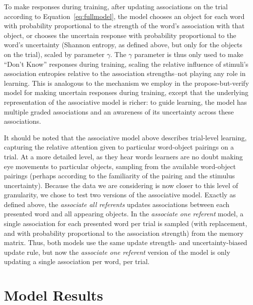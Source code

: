 \documentclass[man,floatsintext]{apa6}
\begin{document}
To make responses during training, after updating associations on the trial according to Equation~\ref{eq:fullmodel}, the model chooses an object for each word with probability proportional to the strength of the word's association with that object, or chooses the uncertain response with probability proportional to the word's uncertainty (Shannon entropy, as defined above, but only for the objects on the trial), scaled by parameter $\gamma$. The $\gamma$ parameter is thus only used to make ``Don't Know'' responses during training, scaling the relative influence of stimuli's association entropies relative to the association strengths--not playing any role in learning. This is analogous to the mechanism we employ in the propose-but-verify model for making uncertain responses during training, except that the underlying representation of the associative model is richer: to guide learning, the model has multiple graded associations and an awareness of its uncertainty across these associations.

It should be noted that the associative model above describes trial-level learning, capturing the relative attention given to particular word-object pairings on a trial. At a more detailed level, as they hear words learners are no doubt making eye movements to particular objects, sampling from the available word-object pairings (perhaps according to the familiarity of the pairing and the stimulus uncertainty). Because the data we are considering is now closer to this level of granularity, we chose to test two versions of the associative model. Exactly as defined above, the {\em associate all referents} updates associations between each presented word and all appearing objects. 
In the {\em associate one referent} model, a single association for each presented word per trial is sampled (with replacement, and with probability proportional to the association strength) from the memory matrix. Thus, both models use the same update strength- and uncertainty-biased update rule, but now the {\em associate one referent} version of the model is only updating a single association per word, per trial.

\section{Model Results}
\end{document}
